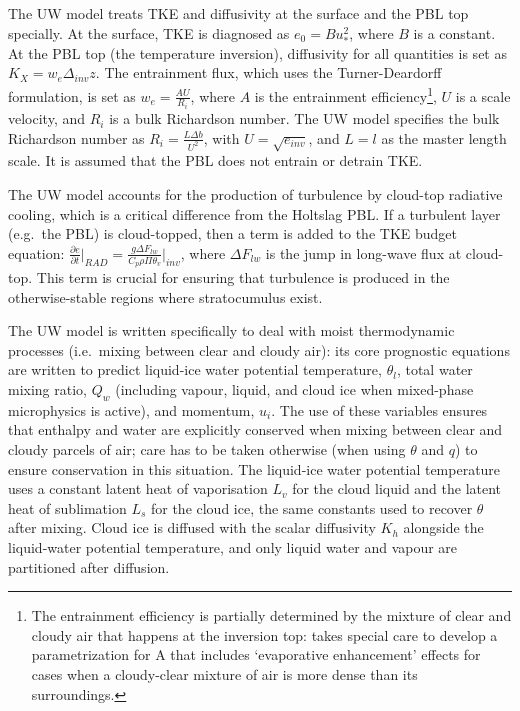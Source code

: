 The UW model treats TKE and diffusivity at the surface and the PBL top
specially.  At the surface, TKE is diagnosed as $e_0 = B u_{*}^2$, where $B$ is
a constant.  At the PBL top (the temperature inversion), diffusivity for all
quantities is set as $K_X = w_e \Delta_{inv}z$.  The entrainment flux, which
uses the Turner-Deardorff formulation, is set as $w_e = \frac{A U}{R_i}$, where
$A$ is the entrainment efficiency\footnote{The entrainment efficiency is
  partially determined by the mixture of clear and cloudy air that happens at
the inversion top: \cite{Grenier_01} takes special care to develop a
parametrization for A that includes `evaporative enhancement' effects for cases
when a cloudy-clear mixture of air is more dense than its surroundings.}, $U$
is a scale velocity, and $R_i$ is a bulk Richardson number.  The UW model
specifies the bulk Richardson number as $R_i = \frac{L \Delta b}{U^2}$, with $U
= \sqrt{e_{inv}}$, and $L = l$ as the master length scale.  It is assumed that
the PBL does not entrain or detrain TKE.

The UW model accounts for the production of turbulence by cloud-top radiative
cooling, which is a critical difference from the Holtslag PBL.  If a turbulent
layer (e.g.~the PBL) is cloud-topped, then a term is added to the TKE budget
equation: $\frac{\partial e}{\partial t}\Bigr\rvert_{RAD} = \frac{g \Delta
F_{lw}}{C_p\rho \Pi \theta_v}\rvert_{inv}$, where $\Delta F_{lw}$ is the jump
in long-wave flux at cloud-top.  This term is crucial for ensuring that
turbulence is produced in the otherwise-stable regions where stratocumulus
exist.

The UW model is written specifically to deal with moist thermodynamic processes
(i.e.~mixing between clear and cloudy air): its core prognostic equations are
written to predict liquid-ice water potential temperature, $\theta_l$, total
water mixing ratio, $Q_w$ (including vapour, liquid, and cloud ice when mixed-phase
microphysics is active), and momentum, $u_i$.  The use of these variables ensures
that enthalpy and water are explicitly conserved when mixing between clear and
cloudy parcels of air; care has to be taken otherwise (when using $\theta$ and
$q$) to ensure conservation in this situation.  The liquid-ice water potential
temperature uses a constant latent heat of vaporisation $L_v$ for the cloud
liquid and the latent heat of sublimation $L_s$ for the cloud ice, the same
constants used to recover $\theta$ after mixing.  Cloud ice is diffused
with the scalar diffusivity $K_h$ alongside the liquid-water potential
temperature, and only liquid water and vapour are partitioned after diffusion.

